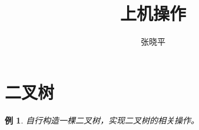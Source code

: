 \documentclass[10pt]{article}
\begin{document}
\renewcommand{\proofname}{\textbf{证明}}
\newtheorem{li}{例}
\newtheorem{jielun}{结论}
\newtheorem{dingli}{定理}
\newtheorem{mingti}{{命题}} 
\newtheorem{yinli}{{引理}} 
\newtheorem{tuilun}{{推论}}
\newtheorem{dingyi}{{定义}} 
\newtheorem*{jie}{{解}}
\newtheorem*{zhengming}{{证明}}
\newtheorem{zhu}{{注}}
\newtheorem*{zhu*}{{注}}
\newtheorem{xingzhi}{{性质}}
\newtheorem{wenti}{{问题}}

\title{上机操作}
\author{张晓平}
\maketitle

\section{二叉树}
\begin{li}
自行构造一棵二叉树，实现二叉树的相关操作。
\end{li}


 

 

 

 

 

 

 

 

 

 

 

 
\end{document}
